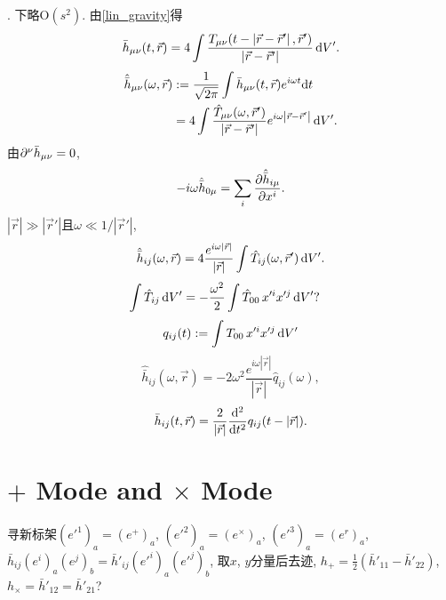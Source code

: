 \cite{Wald1984}. 下略$\text{O}(s^2)$. 由\eqref{lin_gravity}得
\begin{equation}
    \bar{h}_{\mu\nu}(t,\vec{r}) = 4\int 
    \frac{T_{\mu\nu}(t-\left\lvert\vec{r}-\vec{r}'\right\rvert,\vec{r}')}{\left\lvert\vec{r}-\vec{r}'\right\rvert}\,\mathrm{d} V'.
\end{equation}
\begin{align}
    \hat{\bar{h}}_{\mu\nu}(\omega,\vec{r})&:=\frac{1}{\sqrt{2\pi}}
    \int\bar{h}_{\mu\nu}(t,\vec{r})e^{i\omega t}\mathrm{d} t\\
    &=4\int 
    \frac{\hat{T}_{\mu\nu}(\omega,\vec{r}')}{\left\lvert\vec{r}-\vec{r}'\right\rvert}e^{i\omega\left\lvert\vec{r}-\vec{r}'\right\rvert}\,\mathrm{d} V'.
\end{align}
由$\partial^{\nu}\bar{h}_{\mu\nu}=0$,
\begin{equation}
    -i\omega\hat{\bar{h}}_{0\mu}=\sum_{i}\frac{\partial\hat{\bar{h}}_{i\mu}}{\partial x^{i}}.
\end{equation}
$\left\lvert \vec{r}\right\rvert \gg \left\lvert \vec{r}'\right\rvert$且$\omega\ll1/\left\lvert \vec{r}'\right\rvert$,
\begin{equation}
    \hat{\bar{h}}_{ij}(\omega,\vec{r}) = 4
    \frac{e^{i\omega\left\lvert\vec{r}\right\rvert}}{\left\lvert\vec{r}\right\rvert}
    \int \hat{T}_{ij}(\omega,\vec{r}')\,\mathrm{d} V'.
\end{equation}
\begin{align}
    \int \hat{T}_{ij}\,\mathrm{d} V'
    &= -\frac{\omega^2}{2}\int \hat{T}_{00}\,x'^ix'^j\,\mathrm{d} V'?
\end{align}
\begin{equation}
    q_{ij}(t):=\int{T}_{00}\,x'^ix'^j\,\mathrm{d} V'
\end{equation}
\begin{equation}
    \hat{\bar{h}}_{ij}(\omega,\vec{r}) = -2\omega^2\frac{e^{i\omega\left\lvert\vec{r}\right\rvert}}{\left\lvert\vec{r}\right\rvert}\hat{q}_{ij}(\omega),
\end{equation}
\begin{equation}
    {\bar{h}}_{ij}(t,\vec{r}) = \frac{2}{\left\lvert\vec{r}\right\rvert}
    \frac{\mathrm{d}^2}{\mathrm{d} t^2}{q}_{ij}(t-\left\lvert\vec{r}\right\rvert).\label{qf}
\end{equation}

\section{$+$ Mode and $\times$ Mode}

寻新标架$(e'^1)_a=(e^+)_a$, $(e'^2)_a=(e^\times)_a$, $(e'^3)_a=(e^r)_a$, ${\bar{h}}_{ij}(e^i)_a(e^j)_b={\bar{h}}'_{ij}(e'^i)_a(e'^j)_b$, 取$x$, $y$分量后去迹, $h_+=\frac{1}{2}({\bar{h}}'_{11}-{\bar{h}}'_{22})$, $h_\times={\bar{h}}'_{12}={\bar{h}}'_{21}$? \cite{Sathyaprakash2009}

